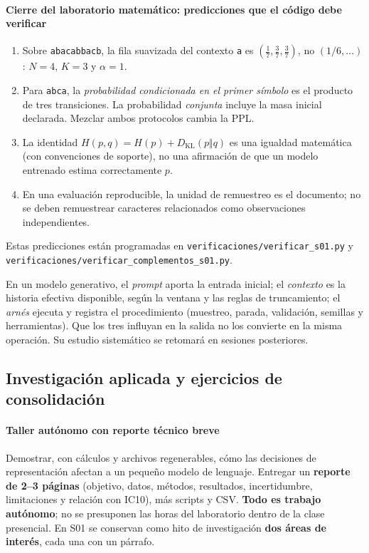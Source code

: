 \paragraph{Cierre del laboratorio matemático: predicciones que el código debe verificar}
\label{s01:lab:mat:cierre}
\begin{enumerate}
\item Sobre \texttt{abacabbacb}, la fila suavizada del contexto \texttt{a} es
$\left(\frac17,\frac37,\frac37\right)$, no $(1/6,\ldots)$:
$N=4$, $K=3$ y $\alpha=1$.
\item Para \texttt{abca}, la \emph{probabilidad condicionada en el primer
símbolo} es el producto de tres transiciones. La probabilidad \emph{conjunta}
incluye la masa inicial declarada. Mezclar ambos protocolos cambia la PPL.
\item La identidad $H(p,q)=H(p)+D_{\mathrm{KL}}(p\Vert q)$ es una igualdad
matemática (con convenciones de soporte), no una afirmación de que un modelo
entrenado estima correctamente $p$.
\item En una evaluación reproducible, la unidad de remuestreo es el documento;
no se deben remuestrear caracteres relacionados como observaciones independientes.
\end{enumerate}
\noindent Estas predicciones están programadas en
\nolinkurl{verificaciones/verificar_s01.py} y
\nolinkurl{verificaciones/verificar_complementos_s01.py}.



\begin{idea}
En un modelo generativo, el \emph{prompt} aporta la entrada inicial; el \emph{contexto} es la historia efectiva disponible, según la ventana y las reglas de truncamiento; el \emph{arnés} ejecuta y registra el procedimiento (muestreo, parada, validación, semillas y herramientas). Que los tres influyan en la salida no los convierte en la misma operación. Su estudio sistemático se retomará en sesiones posteriores.
\end{idea}

\subsection{Investigación aplicada y ejercicios de consolidación}\label{s01:cap:investigacion}

\paragraph{Taller autónomo con reporte técnico breve}
\label{s01:mod:taller}
\begin{taller}
Demostrar, con cálculos y archivos regenerables, cómo las decisiones de
representación afectan a un pequeño modelo de lenguaje. Entregar un
\textbf{reporte de 2--3 páginas} (objetivo, datos, métodos, resultados,
incertidumbre, limitaciones y relación con IC10), más scripts y CSV.
\textbf{Todo es trabajo autónomo}; no se presuponen las horas del laboratorio
dentro de la clase presencial. En S01 se conservan como hito de investigación
\textbf{dos áreas de interés}, cada una con un párrafo.
\end{taller}
